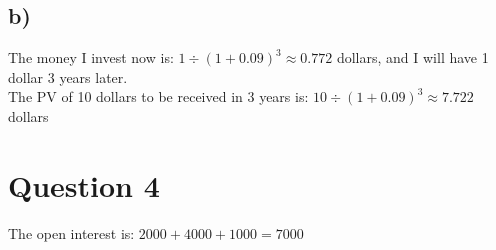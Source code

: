 \documentclass[letterpaper,11pt]{article}
\begin{document}
\begin{spacing}{1.2}
\subsection*{b)}
The money I invest now is:
$1 \div (1 + 0.09)^3 \approx 0.772$
dollars, and I will have 1 dollar 3 years later.\\
The PV of 10 dollars to be received in 3 years is:
$10 \div (1+0.09)^3 \approx 7.722$
dollars

\section*{Question 4}
The open interest is:
$2000 + 4000 + 1000 = 7000$

\end{spacing}
\end{document}
